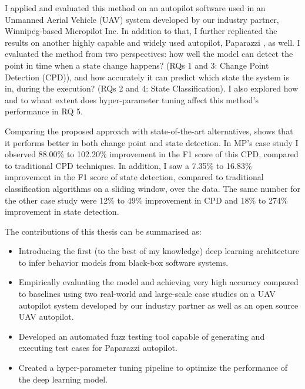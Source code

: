 

I applied and evaluated this method on an autopilot software used in an Unmanned Aerial Vehicle (UAV) system developed by our industry partner, Winnipeg-based Micropilot Inc. In addition to that, I further replicated the results on another highly capable and widely used autopilot, Paparazzi \cite{hattenberger2014using}, as well.
I evaluated the method from two perspectives: how well the model can detect the point in time when a state change happens? (RQs 1 and 3: Change Point Detection (CPD)), and how accurately it can predict which state the system is in, during the execution? (RQs 2 and 4: State Classification). I also explored how and to whaat extent does hyper-parameter tuning affect this method's performance in RQ 5.



Comparing the proposed approach with state-of-the-art alternatives, shows that it performs better in both change point and state detection. In MP's case study I observed 88.00\% to 102.20\% improvement in the F1 score of this CPD, compared to traditional CPD techniques. In addition, I saw a 7.35\% to 16.83\% improvement in the F1 score of state detection, compared to traditional classification algorithms on a sliding window, over the data. The same number for the other case study were 12\% to 49\% improvement in CPD and 18\% to 274\% improvement in state detection.


The contributions of this thesis can be summarised as:
\begin{itemize}
    \item Introducing the first (to the best of my knowledge) deep learning architecture to infer behavior models from black-box software systems.
    \item Empirically evaluating the model and achieving very high accuracy compared to baselines using two real-world and large-scale case studies on a UAV autopilot system developed by our industry partner as well as an open source UAV autopilot.
    \item Developed an automated fuzz testing tool capable of generating and executing test cases for Paparazzi autopilot.
    \item Created a hyper-parameter tuning pipeline to optimize the performance of the deep learning model.
\end{itemize}

